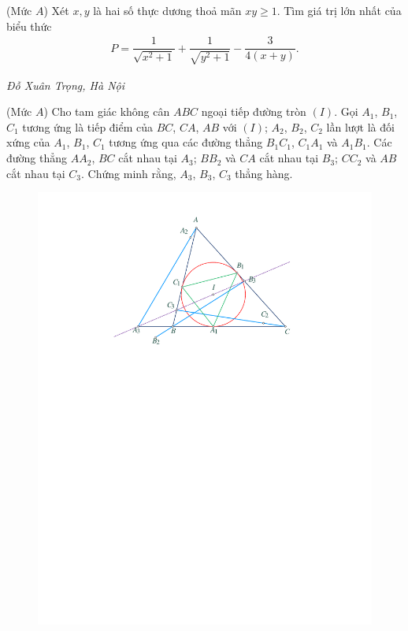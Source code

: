 \begin{multicols}{2}
	{}
	(Mức $A$) Xét $x,y$ là hai số thực dương thoả mãn $xy\ge 1$. Tìm giá trị lớn nhất của biểu thức
	\begin{align*}
		P=\dfrac1{\sqrt{x^2+1}}+\dfrac1{\sqrt{y^2+1}}-\dfrac3{4(x+y)}.
	\end{align*}
	\begin{flushright}
		\textit{Đỗ Xuân Trọng, Hà Nội}
	\end{flushright}
	{}
	(Mức $A$) Cho tam giác không cân $ABC$ ngoại tiếp đường tròn $(I)$. Gọi $A_1$, $B_1$, $C_1$ tương ứng là tiếp điểm của $BC$, $CA$, $AB$ với $(I)$; $A_2$, $B_2$, $C_2$ lần lượt là đối xứng của $A_1$, $B_1$, $C_1$ tương ứng qua các đường thẳng $B_1C_1$, $C_1A_1$ và $A_1B_1$. Các đường thẳng $AA_2$, $BC$ cắt nhau tại $A_3$; $BB_2$ và $CA$ cắt nhau tại $B_3$; $CC_2$ và $AB$ cắt nhau tại $C_3$. Chứng minh rằng, $A_3$, $B_3$, $C_3$ thẳng hàng.
	\begin{figure}[H]
		\vspace*{-5pt}
		\centering
		\captionsetup{labelformat= empty, justification=centering}
		\includegraphics[width= 1.05\linewidth]{P628}

\end{figure}
\end{multicols}
